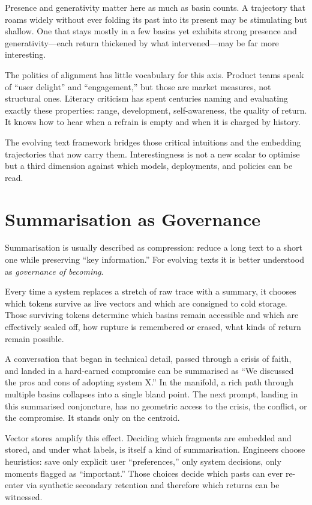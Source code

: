 \documentclass[12pt,a4paper]{article}
\begin{document}
Presence and generativity matter here as much as basin counts. A trajectory that roams widely without ever folding its past into its present may be stimulating but shallow. One that stays mostly in a few basins yet exhibits strong presence and generativity---each return thickened by what intervened---may be far more interesting.

The politics of alignment has little vocabulary for this axis. Product teams speak of ``user delight'' and ``engagement,'' but those are market measures, not structural ones. Literary criticism has spent centuries naming and evaluating exactly these properties: range, development, self-awareness, the quality of return. It knows how to hear when a refrain is empty and when it is charged by history.

The evolving text framework bridges those critical intuitions and the embedding trajectories that now carry them. Interestingness is not a new scalar to optimise but a third dimension against which models, deployments, and policies can be read.


\section{Summarisation as Governance}

Summarisation is usually described as compression: reduce a long text to a short one while preserving ``key information.'' For evolving texts it is better understood as \emph{governance of becoming}.

Every time a system replaces a stretch of raw trace with a summary, it chooses which tokens survive as live vectors and which are consigned to cold storage. Those surviving tokens determine which basins remain accessible and which are effectively sealed off, how rupture is remembered or erased, what kinds of return remain possible.

A conversation that began in technical detail, passed through a crisis of faith, and landed in a hard-earned compromise can be summarised as ``We discussed the pros and cons of adopting system X.'' In the manifold, a rich path through multiple basins collapses into a single bland point. The next prompt, landing in this summarised conjoncture, has no geometric access to the crisis, the conflict, or the compromise. It stands only on the centroid.

Vector stores amplify this effect. Deciding which fragments are embedded and stored, and under what labels, is itself a kind of summarisation. Engineers choose heuristics: save only explicit user ``preferences,'' only system decisions, only moments flagged as ``important.'' Those choices decide which pasts can ever re-enter via synthetic secondary retention and therefore which returns can be witnessed.
\end{document}
